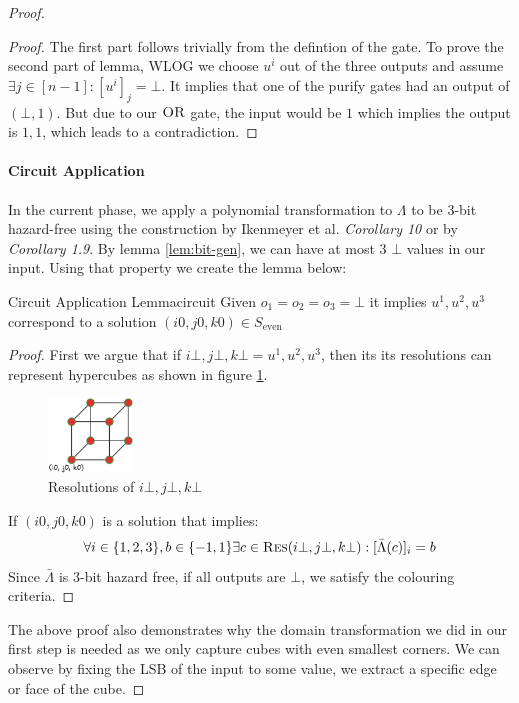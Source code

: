 \begin{proof}
\begin{proof}
    The first part follows trivially from the defintion of the  gate.
    To prove the second part of lemma, WLOG we choose $u^i$ out of the three outputs and
    assume $\exists j \in [n-1]: [u^i]_j = \bot$. It implies  that one of the purify gates had an output of $(\bot, 1)$.
    But due to our $\textsc{OR}$ gate, the input would be $1$ which implies the output is $1,1$, which leads to a contradiction.
\end{proof}


\paragraph{Circuit Application}

In the current phase, we apply a polynomial transformation to $\Lambda$ to be 3-bit hazard-free using the construction
by Ikenmeyer et al. \cite{ikenmeyer_ComplexityHazardfreeCircuits_2019} \textit{Corollary 10} or 
by \cite{bund_SmallHazardFreeTransducers_2025} \textit{Corollary 1.9}.
By lemma \ref{lem:bit-gen}, we can have at most 3 $\bot$ values 
in our input. Using that property we create the lemma below:

\begin{lemmabox}{Circuit Application Lemma}{circuit}
    Given $o_1 = o_2 = o_3 = \bot$ it implies $u^1, u^2, u^3$ correspond to a solution $(i0,j0,k0) \in S_\text{even}$
\end{lemmabox}


\begin{proof}
    First we argue that if $i\bot, j\bot, k\bot = u^1, u^2, u^3$, then
    its its resolutions can represent hypercubes as shown in figure \ref{fig:main-proof:cube-vis}.
    \begin{figure}[h!]
        \centering
        \includegraphics[width=0.2\textwidth]{assets/3d-cube.png}
        \caption{Resolutions of $i\bot, j\bot, k\bot$}\label{fig:main-proof:cube-vis}
    \end{figure}

    If $(i0, j0, k0)$ is a solution that implies:
    $$
    \forall i \in \{1,2,3\}, b \in \{-1, 1\} \exists c \in \textsc{Res}(i\bot, j\bot, k\bot): [\bar{\Lambda}(c)]_i = b
    $$
    Since $\bar{\Lambda}$ is 3-bit hazard free, if all outputs are $\bot$, we satisfy the colouring criteria.
\end{proof}
The above proof also demonstrates why the domain transformation we did in our first step is needed as we only
capture cubes with even smallest corners.  We can observe by fixing the LSB of the input to some value,
we extract a specific edge or face of the cube.



\end{proof}
